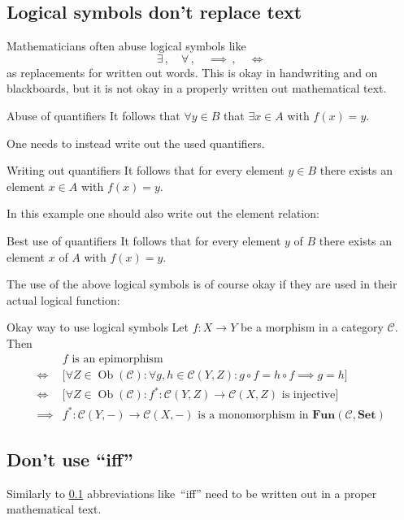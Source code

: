 \subsection{Logical symbols don’t replace text}
\label{no logical symbols}

Mathematicians often abuse logical symbols like
\[
  \exists \,,
  \quad
  \forall \,,
  \quad
  \implies \,,
  \quad
  \iff
\]
as replacements for written out words.
This is okay in handwriting and on blackboards, but it is not okay in a properly written out mathematical text.
\begin{showlatex}{Abuse of quantifiers}
It follows that $\forall y \in B$ that $\exists x \in A$ with $f(x) = y$.
\end{showlatex}
One needs to instead write out the used quantifiers.
\begin{showlatex}{Writing out quantifiers}
It follows that for every element $y \in B$ there exists an element $x \in A$ with $f(x) = y$.
\end{showlatex}
In this example one should also write out the element relation:
\begin{showlatex}{Best use of quantifiers}
It follows that for every element $y$ of $B$ there exists an element $x$ of $A$ with $f(x) = y$.
\end{showlatex}

The use of the above logical symbols is of course okay if they are used in their actual logical function:
\begin{showlatex}{Okay way to use logical symbols}
  Let $f \colon X \to Y$ be a morphism in a category $\mathcal{C}$.
  Then
  \begin{align*}
    {}&
      \text{$f$ is an epimorphism}
    \\
    \iff{}&
    \bigl[
    \forall Z \in \operatorname{Ob}(\mathcal{C}):
    \forall g, h \in \mathcal{C}(Y,Z):
    g \circ f = h \circ f \implies g = h
    \bigr]
    \\
    \iff{}&
    \bigl[
    \forall Z \in \operatorname{Ob}(\mathcal{C}):
    \text{$f^* \colon \mathcal{C}(Y,Z) \to \mathcal{C}(X,Z)$ is injective}
    \bigr]
    \\
    \implies{}&
    \text{$f^* \colon \mathcal{C}(Y,-) \to \mathcal{C}(X,-)$ is a monomorphism in~$\mathbf{Fun}(\mathcal{C}, \mathbf{Set})$}
  \end{align*}
\end{showlatex}



\subsection{Don’t use \enquote{iff}}
\label{no iff}

Similarly to \cref{no logical symbols} abbreviations like~\enquote{iff} need to be written out in a proper mathematical text.




